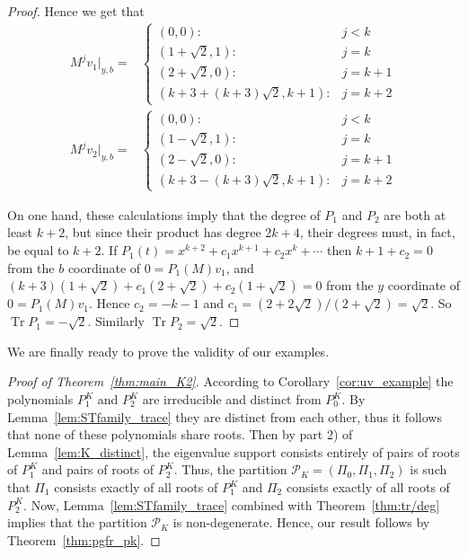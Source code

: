 \documentclass[11pt]{article}
\theoremstyle{definition}
\numberwithin{equation}{section}
\newcommand{\PK}[1][K]{\mathcal{P}_{#1}}
\newcommand\+{\mkern2mu}
\newcommand{\1}{\mathbf 1}
\DeclareMathOperator{\Tr}{Tr}
\begin{document}
\begin{proof}
Hence we get that 
\begin{align*}
M^j v_1|_{y,b} =& \left\{ \begin{array}{cl} (0,0):& j < k \\ (1 + \sqrt{2}, 1) :& j = k\\  (2+\sqrt{2},0)  :& j = k+1 \\ ( k+3 +(k+3)\sqrt{2}, k+1)  :& j = k+2 \end{array} \right. \\
M^j v_2|_{y,b} =& \left\{ \begin{array}{cl} (0,0):& j < k \\ (1 - \sqrt{2}, 1) :& j = k\\  (2-\sqrt{2},0)  :& j = k+1 \\ ( k+3 -(k+3)\sqrt{2}, k+1)  :& j = k+2 \end{array} \right. 
\end{align*}

On one hand, these calculations imply that the degree of $P_1$ and $P_2$ are both at least $k+2$, but since their product has degree $2k+4$, their degrees must, in fact, be equal to $k+2$. If $P_1(t) = x^{k+2} + c_1 x^{k+1} + c_2 x^k + \cdots$ then $k+1 + c_2 = 0$ from the $b$ coordinate of $0 = P_1(M)v_1$, and $(k+3)(1+\sqrt{2}) + c_1(2+\sqrt{2}) + c_2(1+\sqrt{2}) =0$ from the $y$ coordinate of $0 = P_1(M)v_1$. Hence $c_2 = -k-1$ and $c_1 = (2+2\sqrt{2})/(2+\sqrt{2}) = 
\sqrt{2}$. So $\Tr P_1 = -\sqrt{2}$. Similarly $\Tr P_2 = \sqrt{2}$. 
\end{proof}

We are finally ready to prove the validity of our examples.

\begin{proof}[Proof of Theorem~\ref{thm:main_K2}]
According to Corollary~\ref{cor:uv_example} the polynomials $P^K_1$ and $P^K_2$ are irreducible and distinct from $P^K_0$. By Lemma~\ref{lem:STfamily_trace} they are distinct from each other, thus it follows that none of these polynomials share roots. Then by part 2) of Lemma~\ref{lem:K_distinct}, the eigenvalue support consists entirely of pairs of roots of $P^K_1$ and pairs of roots of $P^K_2$. Thus, the partition $\PK = (\Pi_0, \Pi_1, \Pi_2)$ is such that $\Pi_1$ consists exactly of all roots of $P^K_1$ and $\Pi_2$ consists exactly of all roots of $P^K_2$. Now, Lemma~\ref{lem:STfamily_trace} combined with Theorem~\ref{thm:tr/deg} implies that the partition $\PK$ is non-degenerate. Hence, our result follows by Theorem~\ref{thm:pgfr_pk}.
\end{proof}
\end{document}
